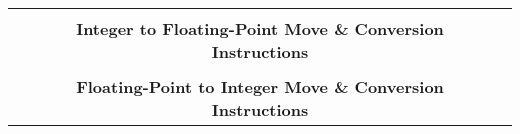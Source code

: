 \begin{table}[p]
\begin{small}
\begin{center}
\begin{tabular}{rcccccccccl}
&
\multicolumn{9}{c}{} & \\
&
\multicolumn{9}{c}{\bf Integer to Floating-Point Move \& Conversion Instructions} & \\
\cline{2-10}
  

&
\multicolumn{9}{c}{} & \\
&
\multicolumn{9}{c}{\bf Floating-Point to Integer Move \& Conversion Instructions} & \\
\cline{2-10}
  

\end{tabular}
\end{center}
\end{small}

\label{instr-table}
\end{table}
  

\newpage


